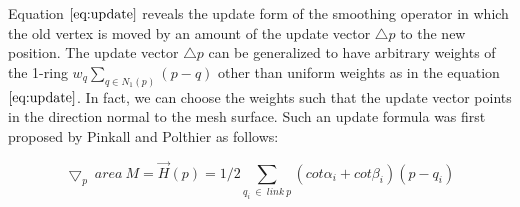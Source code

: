 \documentclass[11pt]{article}
\begin{document}
Equation $\ref{eq:update}$ reveals the update form of the smoothing operator in which the old vertex is moved by an amount of the update vector $\bigtriangleup p$ to the new position. The update vector $\bigtriangleup p$ can be generalized to have arbitrary weights of the 1-ring $w_q\sum\limits_{q \in N_1(p)}(p - q)$ other than uniform weights as in the equation $\ref{eq:update}$. In fact, we can choose the weights such that the update vector points in the direction normal to the mesh surface. Such an update formula was first proposed by Pinkall and Polthier \cite{Pinkall93computingdiscrete} as follows:

\begin{equation}
\bigtriangledown_p\ area\ M = \vec{H}(p) = 1/2\sum\limits_{q_i\ \in\ link\ p}{(cot\alpha_{i} + cot\beta_{i})(p-q_i)}
\end{equation}
\end{document}
